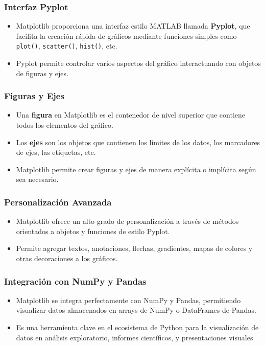 \documentclass[conference]{IEEEtran}
\begin{document}
    \subsubsection*{Interfaz Pyplot}
    \begin{itemize}
      \item Matplotlib proporciona una interfaz estilo MATLAB llamada \textbf{Pyplot}, que facilita la creación rápida de gráficos mediante funciones simples como \texttt{plot()}, \texttt{scatter()}, \texttt{hist()}, etc.
      \item Pyplot permite controlar varios aspectos del gráfico interactuando con objetos de figuras y ejes.
    \end{itemize}
    
    \subsubsection*{Figuras y Ejes}
    \begin{itemize}
      \item Una \textbf{figura} en Matplotlib es el contenedor de nivel superior que contiene todos los elementos del gráfico.
      \item Los \textbf{ejes} son los objetos que contienen los límites de los datos, los marcadores de ejes, las etiquetas, etc. 
      \item Matplotlib permite crear figuras y ejes de manera explícita o implícita según sea necesario.
    \end{itemize}
    
    \subsubsection*{Personalización Avanzada}
    \begin{itemize}
      \item Matplotlib ofrece un alto grado de personalización a través de métodos orientados a objetos y funciones de estilo Pyplot.
      \item Permite agregar textos, anotaciones, flechas, gradientes, mapas de colores y otras decoraciones a los gráficos.
    \end{itemize}
    
    \subsubsection*{Integración con NumPy y Pandas}
    \begin{itemize}
      \item Matplotlib se integra perfectamente con NumPy y Pandas, permitiendo visualizar datos almacenados en arrays de NumPy o DataFrames de Pandas.
      \item Es una herramienta clave en el ecosistema de Python para la visualización de datos en análisis exploratorio, informes científicos, y presentaciones visuales.
    \end{itemize}
    
\end{document}
